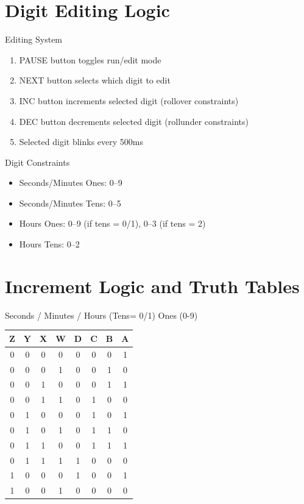 \documentclass{beamer}
\begin{document}
\section{Digit Editing Logic}
\begin{frame}{Editing System}
\begin{enumerate}
    \item PAUSE button toggles run/edit mode
    \item NEXT button selects which digit to edit
    \item INC button increments selected digit (rollover constraints)
    \item DEC button decrements selected digit (rollunder constraints)
    \item Selected digit blinks every 500ms
\end{enumerate}
\end{frame}

\begin{frame}{Digit Constraints}
\begin{itemize}
    \item Seconds/Minutes Ones: 0–9
    \item Seconds/Minutes Tens: 0–5
    \item Hours Ones: 0–9 (if tens = 0/1), 0–3 (if tens = 2)
    \item Hours Tens: 0–2
\end{itemize}
\end{frame}

\section{Increment Logic and Truth Tables}

\begin{frame}{Seconds / Minutes / Hours (Tens= 0/1) Ones (0-9)}
\centering
\begin{tabular}{|c|c|c|c||c|c|c|c|}
\hline
Z & Y & X & W & D & C & B & A\\
\hline
0&0&0&0&0&0&0&1\\
0&0&0&1&0&0&1&0\\
0&0&1&0&0&0&1&1\\
0&0&1&1&0&1&0&0\\
0&1&0&0&0&1&0&1\\
0&1&0&1&0&1&1&0\\
0&1&1&0&0&1&1&1\\
0&1&1&1&1&0&0&0\\
1&0&0&0&1&0&0&1\\
1&0&0&1&0&0&0&0\\
\hline
\end{tabular}

\end{frame}
\end{document}
